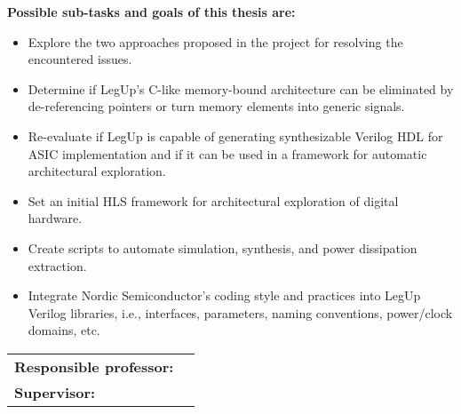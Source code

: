 \begin{titlingpage}
\textbf{Possible sub-tasks and goals of this thesis are:}
\begin{itemize}
    \item Explore the two approaches proposed in the project for resolving the encountered issues.
    \item Determine if LegUp’s C-like memory-bound architecture can be eliminated by de-referencing pointers or turn memory elements into generic signals.
    \item Re-evaluate if LegUp is capable of generating synthesizable Verilog HDL for ASIC implementation and if it can be used in a framework for automatic architectural exploration.
    \item Set an initial HLS framework for architectural exploration of digital hardware.
    \item Create scripts to automate simulation, synthesis, and power dissipation extraction.
    \item Integrate Nordic Semiconductor's coding style and practices into LegUp Verilog libraries, i.e., interfaces, parameters, naming conventions, power/clock domains, etc.
\end{itemize}


\vspace{6ex}

\noindent
\begin{tabular}{@{}p{4cm}l}
\textbf{Responsible professor:} 	& \theprofessor \\
\textbf{Supervisor:}			& \thesupervisor \\
\end{tabular}

\end{titlingpage}